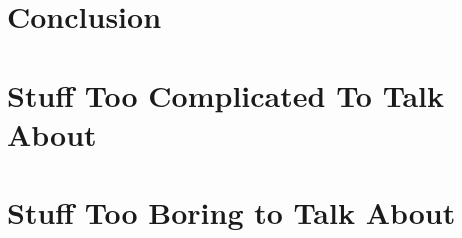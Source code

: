 \documentclass[12pt]{report}   %
\begin{document}

%
\clearpage{\pagestyle{empty}\cleardoublepage}

\chapter{Conclusion}
%
\clearpage{\pagestyle{empty}\cleardoublepage}

\appendix
\chapter{Stuff Too Complicated To Talk About}
%
\clearpage{\pagestyle{empty}\cleardoublepage}

\chapter{Stuff Too Boring to Talk About}
%
\clearpage{\pagestyle{empty}\cleardoublepage}



\begin{spacing}{0.9}
  
\end{spacing}
\end{document}
